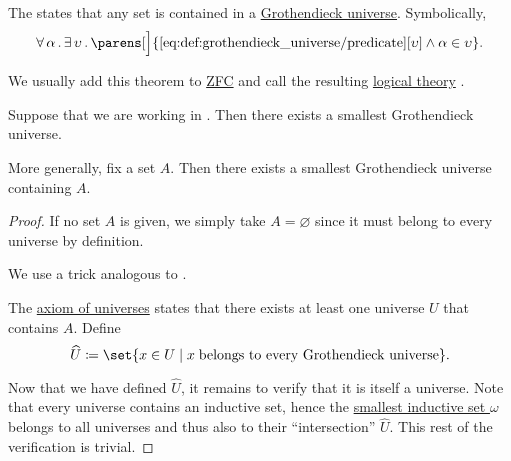 \begin{definition}\label{def:axiom_of_universes}
  The  states that any set is contained in a \hyperref[def:grothendieck_universe]{Grothendieck universe}. Symbolically,
  \begin{equation}\label{eq:def:axiom_of_universes}
    \begin{aligned}
      \qforall \alpha \qexists \upsilon \parens[\Big]{ \ref{eq:def:grothendieck_universe/predicate}[\upsilon] \wedge \alpha \in \upsilon }.
    \end{aligned}
  \end{equation}

  We usually add this theorem to \hyperref[def:zfc]{ZFC} and call the resulting \hyperref[def:first_order_theory]{logical theory} .
\end{definition}

\begin{proposition}\label{thm:smallest_grothendieck_universe_existence}
  Suppose that we are working in . Then there exists a smallest Grothendieck universe.

  More generally, fix a set \( A \). Then there exists a smallest Grothendieck universe containing \( A \).
\end{proposition}
\begin{proof}
  If no set \( A \) is given, we simply take \( A = \varnothing \) since it must belong to every universe by definition.

  We use a trick analogous to .

  The \hyperref[def:axiom_of_universes]{axiom of universes} states that there exists at least one universe \( U \) that contains \( A \). Define
  \begin{equation*}
    \widehat U \coloneqq \set{ x \in U \given x \T{belongs to every Grothendieck universe} }.
  \end{equation*}

  Now that we have defined \( \widehat U \), it remains to verify that it is itself a universe. Note that every universe contains an inductive set, hence the \hyperref[thm:smallest_inductive_set_existence]{smallest inductive set \( \omega \)} belongs to all universes and thus also to their \enquote{intersection} \( \widehat U \). This rest of the verification is trivial.
\end{proof}

